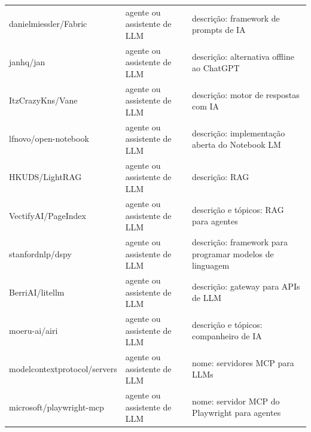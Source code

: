 \begin{tabular}{lll}
danielmiessler/Fabric & agente ou assistente de LLM & descrição: framework de prompts de IA \\
janhq/jan & agente ou assistente de LLM & descrição: alternativa offline ao ChatGPT \\
ItzCrazyKns/Vane & agente ou assistente de LLM & descrição: motor de respostas com IA \\
lfnovo/open-notebook & agente ou assistente de LLM & descrição: implementação aberta do Notebook LM \\
HKUDS/LightRAG & agente ou assistente de LLM & descrição: RAG \\
VectifyAI/PageIndex & agente ou assistente de LLM & descrição e tópicos: RAG para agentes \\
stanfordnlp/dspy & agente ou assistente de LLM & descrição: framework para programar modelos de linguagem \\
BerriAI/litellm & agente ou assistente de LLM & descrição: gateway para APIs de LLM \\
moeru-ai/airi & agente ou assistente de LLM & descrição e tópicos: companheiro de IA \\
modelcontextprotocol/servers & agente ou assistente de LLM & nome: servidores MCP para LLMs \\
microsoft/playwright-mcp & agente ou assistente de LLM & nome: servidor MCP do Playwright para agentes \\
\bottomrule
\end{tabular}
